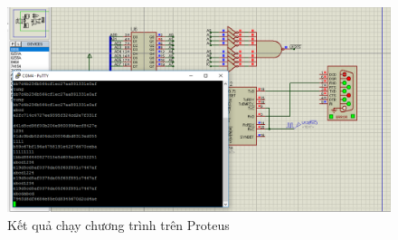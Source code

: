 \documentclass[../report.tex]{subfiles}
\begin{document}
\begin{figure}[H]
    \centering
    \includegraphics[width=\textwidth]{figures/result.png}
    \caption{Kết quả chạy chương trình trên Proteus}
\end{figure}
\end{document}
